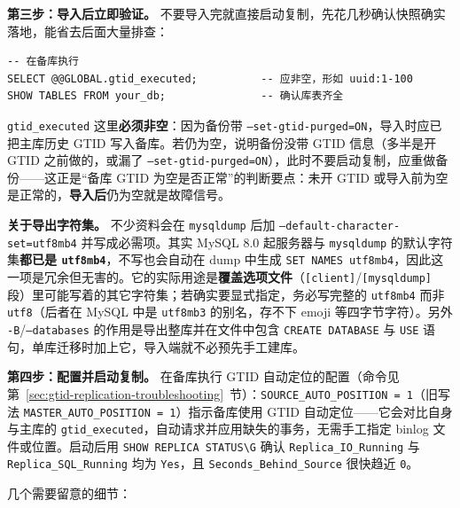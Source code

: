 \documentclass[12pt,UTF8]{ctexbook}
\begin{document}
\textbf{第三步：导入后立即验证。} 不要导入完就直接启动复制，先花几秒确认快照确实落地，能省去后面大量排查：

\begin{lstlisting}
-- 在备库执行
SELECT @@GLOBAL.gtid_executed;          -- 应非空，形如 uuid:1-100
SHOW TABLES FROM your_db;               -- 确认库表齐全
\end{lstlisting}

\texttt{gtid\_executed} 这里\textbf{必须非空}：因为备份带 \texttt{--set-gtid-purged=ON}，导入时应已把主库历史 GTID 写入备库。若仍为空，说明备份没带 GTID 信息（多半是开 GTID 之前做的，或漏了 \texttt{--set-gtid-purged=ON}），此时不要启动复制，应重做备份——这正是“备库 GTID 为空是否正常”的判断要点：未开 GTID 或导入前为空是正常的，\textbf{导入后}仍为空就是故障信号。

\textbf{关于导出字符集。} 不少资料会在 \texttt{mysqldump} 后加 \texttt{--default-character-set=utf8mb4} 并写成必需项。其实 MySQL 8.0 起服务器与 \texttt{mysqldump} 的默认字符集\textbf{都已是 \texttt{utf8mb4}}，不写也会自动在 dump 中生成 \texttt{SET NAMES utf8mb4}，因此这一项是冗余但无害的。它的实际用途是\textbf{覆盖选项文件}（\texttt{[client]}/\texttt{[mysqldump]} 段）里可能写着的其它字符集；若确实要显式指定，务必写完整的 \texttt{utf8mb4} 而非 \texttt{utf8}（后者在 MySQL 中是 \texttt{utf8mb3} 的别名，存不下 emoji 等四字节字符）。另外 \texttt{-B}/\texttt{--databases} 的作用是导出整库并在文件中包含 \texttt{CREATE DATABASE} 与 \texttt{USE} 语句，单库迁移时加上它，导入端就不必预先手工建库。

\textbf{第四步：配置并启动复制。} 在备库执行 GTID 自动定位的配置（命令见第~\ref{sec:gtid-replication-troubleshooting}~节）：\texttt{SOURCE\_AUTO\_POSITION = 1}（旧写法 \texttt{MASTER\_AUTO\_POSITION = 1}）指示备库使用 GTID 自动定位——它会对比自身与主库的 \texttt{gtid\_executed}，自动请求并应用缺失的事务，无需手工指定 binlog 文件或位置。启动后用 \verb|SHOW REPLICA STATUS\G| 确认 \texttt{Replica\_IO\_Running} 与 \texttt{Replica\_SQL\_Running} 均为 \texttt{Yes}，且 \texttt{Seconds\_Behind\_Source} 很快趋近 \texttt{0}。

几个需要留意的细节：
\end{document}

